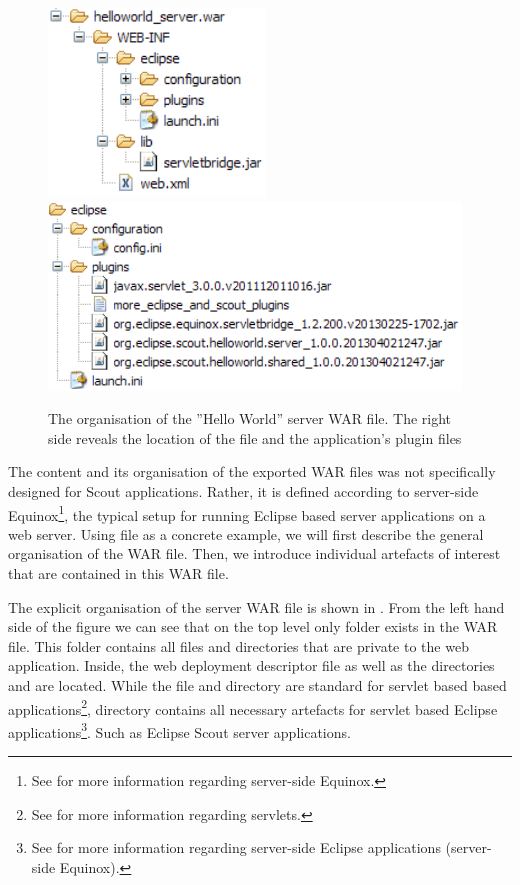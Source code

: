 \documentclass[a4paper,10pt,twoside]{book}
\begin{document}
\begin{figure}
\includegraphics[height=5cm]{helloworld_server_war.png} \hspace{5mm}
\includegraphics[height=5cm]{helloworld_server_war_eclipse.png}
\caption{The organisation of the ''Hello World'' server WAR file.
The right side reveals the location of the  file and the application's plugin files} 
\end{figure}

The content and its organisation of the exported WAR files was not specifically designed for Scout applications. 
Rather, it is defined according to server-side Equinox\footnote{
See  for more information regarding server-side Equinox.
},
the typical setup for running Eclipse based server applications on a web server.
Using file  as a concrete example, we will first describe the general organisation of the WAR file.
Then, we introduce individual artefacts of interest that are contained in this WAR file.

The explicit organisation of the server WAR file is shown in .
From the left hand side of the figure we can see that on the top level only folder  exists in the WAR file.
This folder contains all files and directories that are private to the web application.
Inside, the web deployment descriptor file  as well as the directories  and  are located.
While the  file and directory  are standard for servlet based based applications\footnote{
See  for more information regarding servlets.
},
directory  contains all necessary artefacts for servlet based Eclipse applications\footnote{
See  for more information regarding server-side Eclipse applications (server-side Equinox). 
}.
Such as Eclipse Scout server applications.
\end{document}
